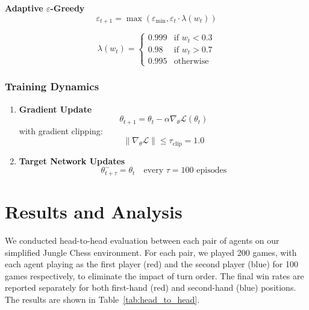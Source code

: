 \documentclass{article}
\begin{document}
\textbf{Adaptive $\varepsilon$-Greedy}
\[ \varepsilon_{t+1} = \max(\varepsilon_{\min}, \varepsilon_t \cdot \lambda(w_t)) \]

\[ \lambda(w_t) = \begin{cases}
0.999 & \text{if } w_t < 0.3 \\
0.98 & \text{if } w_t > 0.7 \\
0.995 & \text{otherwise}
\end{cases} \]

\subsubsection{Training Dynamics}

\begin{enumerate}
    \item \textbf{Gradient Update}
    \[ \theta_{t+1} = \theta_t - \alpha \nabla_\theta \mathcal{L}(\theta_t) \]
with gradient clipping:
\[ \|\nabla_\theta \mathcal{L}\| \leq \tau_{\text{clip}} = 1.0 \]
    \item \textbf{Target Network Updates}
\[ \theta^-_{t+\tau} = \theta_t \quad \text{every } \tau = 100 \text{ episodes} \]

\end{enumerate}



\section{Results and Analysis}

We conducted head-to-head evaluation between each pair of agents on our simplified Jungle Chess environment. For each pair, we played 200 games, with each agent playing as the first player (red) and the second player (blue) for 100 games respectively, to eliminate the impact of turn order. The final win rates are reported separately for both first-hand (red) and second-hand (blue) positions. The results are shown in Table~\ref{tab:head_to_head}.


\end{document}
